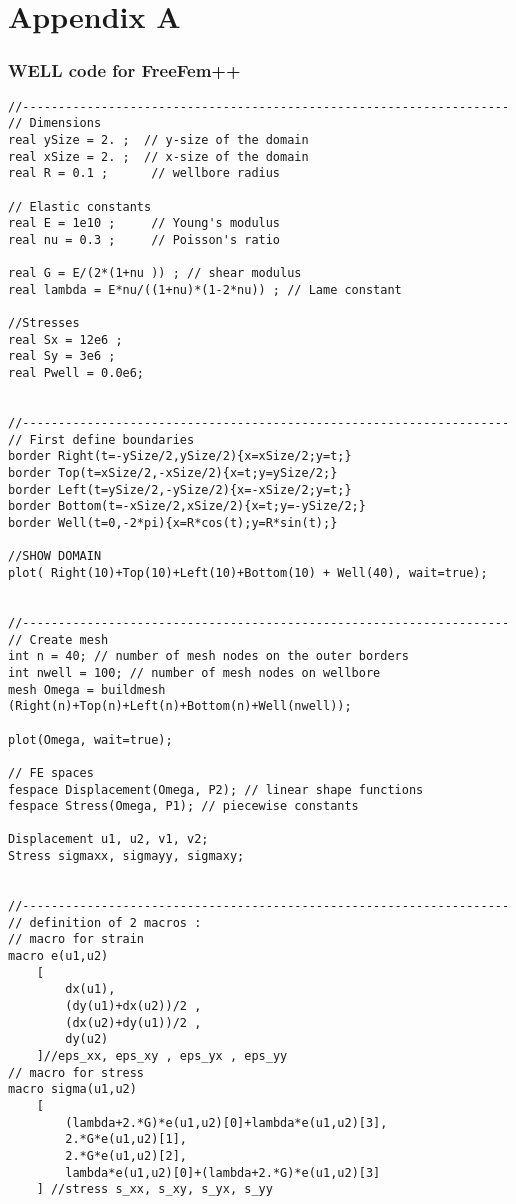 \documentclass[8pt]{extarticle}
\begin{document}
    \newpage

\hypertarget{appendix-a}{%
\section*{Appendix A}\label{appendix-a}}

\hypertarget{well-code-for-freefem}{%
\subsubsection*{WELL code for FreeFem++}\label{well-code-for-freefem}}

\begin{verbatim}
//--------------------------------------------------------------------
// Dimensions
real ySize = 2. ;  // y-size of the domain
real xSize = 2. ;  // x-size of the domain
real R = 0.1 ;      // wellbore radius

// Elastic constants
real E = 1e10 ;     // Young's modulus
real nu = 0.3 ;     // Poisson's ratio

real G = E/(2*(1+nu )) ; // shear modulus
real lambda = E*nu/((1+nu)*(1-2*nu)) ; // Lame constant

//Stresses
real Sx = 12e6 ;
real Sy = 3e6 ;
real Pwell = 0.0e6;


//--------------------------------------------------------------------
// First define boundaries 
border Right(t=-ySize/2,ySize/2){x=xSize/2;y=t;}
border Top(t=xSize/2,-xSize/2){x=t;y=ySize/2;}
border Left(t=ySize/2,-ySize/2){x=-xSize/2;y=t;}
border Bottom(t=-xSize/2,xSize/2){x=t;y=-ySize/2;} 
border Well(t=0,-2*pi){x=R*cos(t);y=R*sin(t);}

//SHOW DOMAIN
plot( Right(10)+Top(10)+Left(10)+Bottom(10) + Well(40), wait=true);


//--------------------------------------------------------------------
// Create mesh 
int n = 40; // number of mesh nodes on the outer borders 
int nwell = 100; // number of mesh nodes on wellbore 
mesh Omega = buildmesh (Right(n)+Top(n)+Left(n)+Bottom(n)+Well(nwell));

plot(Omega, wait=true);

// FE spaces 
fespace Displacement(Omega, P2); // linear shape functions 
fespace Stress(Omega, P1); // piecewise constants

Displacement u1, u2, v1, v2;
Stress sigmaxx, sigmayy, sigmaxy;


//--------------------------------------------------------------------
// definition of 2 macros : 
// macro for strain 
macro e(u1,u2)
    [
        dx(u1),
        (dy(u1)+dx(u2))/2 ,
        (dx(u2)+dy(u1))/2 , 
        dy(u2)
    ]//eps_xx, eps_xy , eps_yx , eps_yy
// macro for stress 
macro sigma(u1,u2)
    [
        (lambda+2.*G)*e(u1,u2)[0]+lambda*e(u1,u2)[3],
        2.*G*e(u1,u2)[1],
        2.*G*e(u1,u2)[2],
        lambda*e(u1,u2)[0]+(lambda+2.*G)*e(u1,u2)[3]
    ] //stress s_xx, s_xy, s_yx, s_yy


\end{verbatim}
\end{document}
